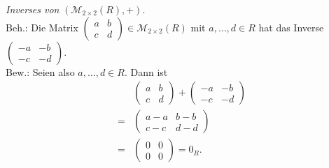 \documentclass[12pt,a4paper]{article}
\begin{document}
\begin{enumerate}[(a)]
    \textit{Inverses von} $(\mathcal{M}_{2\times2}(R), +)$.\\
    Beh.: Die Matrix $\begin{pmatrix}
    a & b\\ c & d
    \end{pmatrix} \in \mathcal{M}_{2\times2}(R)$ mit $a,\dots,d \in R$ hat das Inverse $\begin{pmatrix}
    -a & -b\\ -c & -d
    \end{pmatrix}$.\\
    Bew.: Seien also $a,\dots,d \in R$.
    Dann ist
    \begin{align*}
        &\begin{pmatrix}
        a & b\\ c & d
        \end{pmatrix} + \begin{pmatrix}
        -a & -b\\ -c & -d
        \end{pmatrix}\\
        = &\begin{pmatrix}
        a-a & b-b\\ c-c & d-d
        \end{pmatrix}\\
        = &\begin{pmatrix}
        0&0\\0&0
        \end{pmatrix} = 0_R.
    \end{align*}


\end{enumerate}
\end{document}
